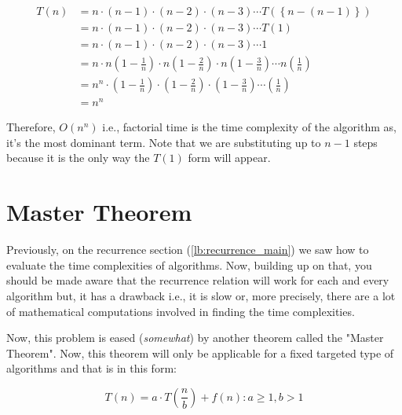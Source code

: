 \documentclass[a4paper,12pt]{article}
\theoremstyle{definition}
\begin{document}
    \begin{align*}
        T(n) & = n \cdot (n - 1) \cdot (n - 2) \cdot (n - 3) \cdots T(\left\{n - (n - 1)\right\})                                                               \\
        & = n \cdot (n - 1) \cdot (n - 2) \cdot (n - 3) \cdots T(1)                                                                                        \\
        & = n \cdot (n - 1) \cdot (n - 2) \cdot (n - 3) \cdots 1                                                                                           \\
        & = n \cdot n\left(1 - \frac{1}{n}\right) \cdot n\left(1 - \frac{2}{n}\right) \cdot n\left(1 - \frac{3}{n}\right) \cdots n\left(\frac{1}{n}\right) \\
        & = n^n \cdot \left(1 - \frac{1}{n}\right) \cdot \left(1 - \frac{2}{n}\right) \cdot \left(1 - \frac{3}{n}\right) \cdots \left(\frac{1}{n}\right)   \\
        & = n^n
    \end{align*}

    Therefore, $O(n^n)$ i.e., factorial time is the time complexity of the algorithm as, it's the most dominant term.
    Note that we are substituting up to $n - 1$ steps because it is the only way the $T(1)$ form will appear.


    \section{Master Theorem}

    Previously, on the recurrence section (\ref{lb:recurrence_main}) we saw how to evaluate the time complexities
    of algorithms.
    Now, building up on that, you should be made aware that the recurrence relation will work for each and every
    algorithm but, it has a drawback i.e., it is slow or, more precisely, there are a lot of mathematical
    computations involved in finding the time complexities.

    Now, this problem is eased (\textit{somewhat}) by another theorem called the "Master Theorem".
    Now, this theorem will only be applicable for a fixed targeted type of algorithms and that is in this form:

    \begin{equation*}
        T(n) = a \cdot T\left(\frac{n}{b}\right) + f(n) : a \geq 1,b > 1
    \end{equation*}
\end{document}
